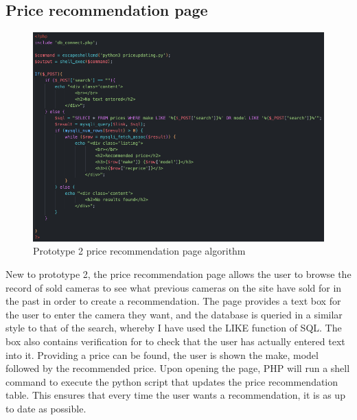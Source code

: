 \subsection{Price recommendation page}
\begin{figure}[H]
    \centering
    \includegraphics[scale=0.5]{ch3_developing/proto2/proto2_pricerec_page.png}
    \caption{Prototype 2 price recommendation page algorithm}
    \label{fig:proto2_pricerec}
\end{figure}
New to prototype 2, the price recommendation page allows the user to browse the record of sold cameras to see what previous cameras on the site have sold for in the past in order to create a recommendation. The page provides a text box for the user to enter the camera they want, and the database is queried in a similar style to that of the search, whereby I have used the LIKE function of SQL. The box also contains verification for to check that the user has actually entered text into it. Providing a price can be found, the user is shown the make, model followed by the recommended price. Upon opening the page, PHP will run a shell command to execute the python script that updates the price recommendation table. This ensures that every time the user wants a recommendation, it is as up to date as possible.


